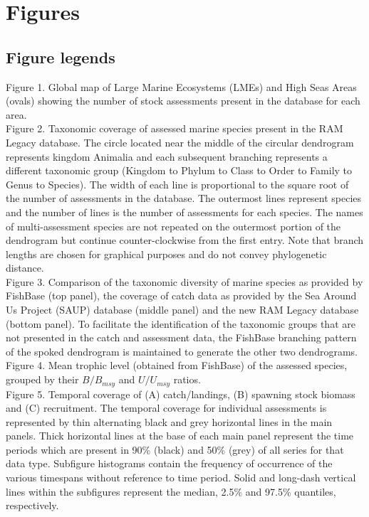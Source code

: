 \section*{Figures}
\subsection*{Figure legends}

\noindent Figure 1. Global map of Large Marine Ecosystems (LMEs) and High Seas Areas (ovals) showing the
number of stock assessments present in the database for each area. \\ 

\noindent Figure 2. Taxonomic coverage of assessed marine species present in the
RAM Legacy database. The circle located near the middle of the circular
dendrogram represents kingdom Animalia and each subsequent branching
represents a different taxonomic group (Kingdom to Phylum to Class to
Order to Family to Genus to Species). The width of each line is
proportional to the square root of the number of assessments in the
database. The outermost lines represent species and the number of
lines is the number of assessments for each species. The names of
multi-assessment species are not repeated on the outermost portion of
the dendrogram but continue counter-clockwise from the first entry.
Note that branch lengths are chosen for graphical purposes and do not
convey phylogenetic distance.\\ 

\noindent Figure 3. Comparison of the taxonomic diversity of marine
species as provided by FishBase (top panel), the coverage of catch
data as provided by the Sea Around Us Project (SAUP) database (middle
panel) and the new RAM Legacy database (bottom panel). To facilitate the
identification of the taxonomic groups that are not presented in the catch
and assessment data, the FishBase branching pattern of the spoked dendrogram is
maintained to generate the other two dendrograms.\\ 

\noindent Figure 4. Mean trophic level (obtained from FishBase) of the assessed species, grouped by their $B/B_{msy}$ and $U/U_{msy}$ ratios. \\ 

\noindent Figure 5. Temporal coverage of (A) catch/landings, (B) spawning stock
biomass and (C) recruitment. The temporal coverage for individual
assessments is represented by thin alternating black and grey
horizontal lines in the main panels. Thick horizontal lines at the
base of each main panel represent the time periods which are present
in 90\% (black) and 50\% (grey) of all series for that data type.
Subfigure histograms contain the frequency of occurrence of the
various timespans without reference to time period. Solid and
long-dash vertical lines within the subfigures represent the median,
2.5\% and 97.5\% quantiles, respectively.\\ 

